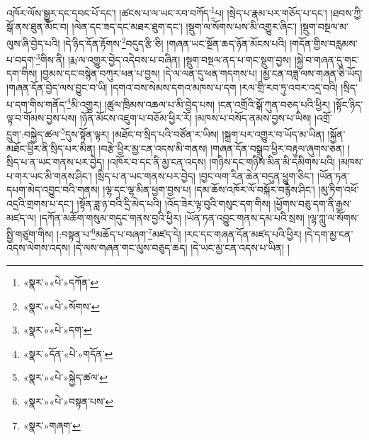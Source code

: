 འཁོར་ལོས་སྒྱུར་དང་དབང་པོ་དང་། །ཚངས་པ་ལ་ཡང་རབ་བཀོད་\footnote{«སྣར་»«པེ་»དཀོན་}པ། །སྲེད་པ་རྣམ་པར་གཅོད་པ་དང་། །ཐབས་ཀྱི་སྒོ་ནས་ཐུན་མོང་བ། །ལེན་དང་ཟད་དང་མཐར་ཐུག་དང་། །སྡུག་ལ་སོགས་པས་མི་འགྱུར་ཞིང་། །སྡུག་བསྔལ་མ་ལུས་ཞི་བྱེད་པའི། །དེ་ཉིད་དོན་རྟོགས་\footnote{«སྣར་»«པེ་»སོགས་}བདུད་རྩི་ཅི། །གཞན་ཡང་སྔོན་ཆད་ཉོན་མོངས་པའི། །གདོན་གྱིས་བརླམས་པ་བདག་\footnote{«སྣར་»«པེ་»དག་}གིས་ནི། །རྨ་ལ་འགྱུར་བྱེད་འདེབས་པ་བཞིན། །སྡུག་བསྔལ་ནད་པ་གང་སྡུག་བྱས། །སྐྱེ་བ་གཞན་དུ་གང་དག་གིས། །བྱམས་དང་བསྙེན་བཀུར་ཕན་པ་བྱས། །དེ་ལ་ལན་དུ་ཕན་གདགས་པ། །མྱ་ངན་བཟླ་ལས་གཞན་ཅི་ཡོད། །གཞན་དོན་བྱེད་ལས་བྱུང་བ་ཡི། །དགའ་བས་སེམས་དགའ་མཁས་པ་དག །རལ་གྲི་རབ་ཏུ་འབར་འདྲ་བའི། །སྲིད་པ་དག་གིས་གནོད་\footnote{«སྣར་»དོན་«པེ་»གདོན་}མི་འགྱུར། །ཚུལ་ཁྲིམས་འཆལ་པ་མི་བྱེད་པས། །ངན་འགྲོའི་སྒོ་ཀུན་བཅད་པའི་ཕྱིར། །སྟོང་ཉིད་ལྟ་བ་གོམས་བྱས་པས། །ཉོན་མོངས་འཇུག་པ་བཅོམ་ཕྱིར་རོ། །མཁས་པ་བསོད་ནམས་བྱས་པ་ཡིས། །འགྲོ་དྲུག་:བསྐྱེད་ཚལ་\footnote{«སྣར་»«པེ་»སྐྱེད་ཚལ་}དུས་སྟོན་ལྟར། །མཐོང་བ་སྲིད་པའི་བཙོན་ར་ཡིས། །སྐྲག་པར་འགྱུར་བ་ཡོད་མ་ཡིན། །སྐྱོན་མཐོང་ཕྱིར་ནི་སྲིད་པར་མིན། །བརྩེ་ཕྱིར་མྱ་ངན་འདས་མི་གནས། །གཞན་དོན་བསྒྲུབ་ཕྱིར་བརྟུལ་ཞུགས་ཅན། །སྲིད་པ་ན་ཡང་གནས་པར་བྱེད། །འཁོར་བ་དང་ནི་མྱ་ངན་འདས། །གཉིས་དང་གཉིས་མིན་མི་དམིགས་པའི། །མཁས་པ་གར་ཡང་མི་གནས་ཤིང་། །སྲིད་པ་ན་ཡང་གནས་པར་བྱེད། །བྱང་ལག་རིན་ཆེན་བདུན་ཕྱུག་ཅིང་། །ཡོན་ཏན་དཔག་མེད་འབྱུང་བའི་གནས། །ལྷ་དང་ལྷ་མིན་ཕྱག་བྱས་པ། །དམ་ཆོས་འཁོར་ལོ་བསྐོར་བརྙེས་ཤིང་། །མུ་ཏིག་འཕོ་འདྲའི་གྲགས་པ་དང་། །སྟོན་ཟླ་ཉ་བའི་དྲི་མེད་པའི། །འོད་ཟེར་ལྟ་བུའི་གསུང་དག་གིས། །ཕྱོགས་བཅུ་དག་ནི་རྒྱས་མཛད་ལ། །དཀོན་མཆོག་གསུམ་གདུང་གནས་བྱའི་ཕྱིར། །ཡོན་ཏན་འབྱུང་གནས་དམ་པའི་སྲས། །ལྷ་ཀླུ་ལ་སོགས་སྤྱི་གཙུག་གིས། །:བསྟན་པ་\footnote{«སྣར་»«པེ་»བསྟན་པས་}མཆོད་པ་བཞག་\footnote{«སྣར་»གཞག་}མཛད་དེ། །རང་དང་གཞན་དོན་མཛད་པའི་ཕྱིར། །དེ་དག་མྱ་ངན་འདས་ལེགས་འདས། །དེ་ལས་གཞན་གང་ལུས་བཅུད་ཆད། །དེ་ཡང་མྱ་ངན་འདས་པ་ཡིན། །
